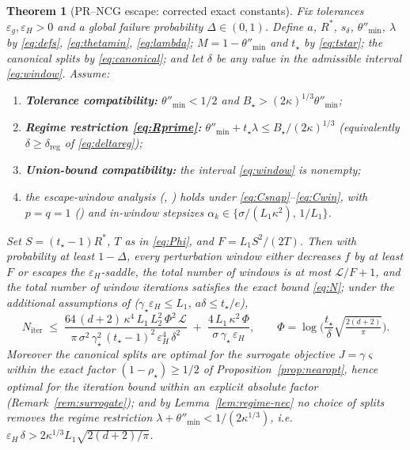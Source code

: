 \documentclass[11pt,a4paper]{article}
\theoremstyle{plain}
\newtheorem{theorem}{Theorem}
\theoremstyle{definition}
\newcommand{\eps}{\varepsilon}
\newcommand{\epsg}{\eps_{g}}
\newcommand{\epsH}{\eps_{H}}
\newcommand{\sdel}{s_{\delta}}
\newcommand{\LL}{\mathcal{L}}
\newcommand{\Rstar}{R^{*}}
\newcommand{\Niter}{N_{\mathrm{iter}}}
\newcommand{\tstar}{t_\star}
\newcommand{\thetamin}{\theta''_{\min}}
\begin{document}
\begin{theorem}[PR--NCG escape: corrected exact constants]\label{thm:main}
Fix tolerances $\epsg, \epsH > 0$ and a global failure probability
$\Delta \in (0,1)$. Define $a$, $\Rstar$, $\sdel$, $\thetamin$, $\lambda$ by
\eqref{eq:defs}, \eqref{eq:thetamin}, \eqref{eq:lambda};
$M = 1-\thetamin$ and $\tstar$ by \eqref{eq:tstar}; the canonical splits by
\eqref{eq:canonical}; and let $\delta$ be any value in the admissible
interval \eqref{eq:window}. Assume:
\begin{enumerate}
\item \textbf{Tolerance compatibility:} $\thetamin < 1/2$ and
$B_\star > (2\kappa)^{1/3}\thetamin$;
\item \textbf{Regime restriction \eqref{eq:Rprime}:}
$\thetamin + \tstar\lambda \le B_\star/(2\kappa)^{1/3}$
(equivalently $\delta \ge \delta_{\mathrm{reg}}$ of
\eqref{eq:deltareg});
\item \textbf{Union-bound compatibility:} the interval \eqref{eq:window}
is nonempty;
\item the escape-window analysis (,
) holds under
\eqref{eq:Csnap}--\eqref{eq:Cwin}, with $p=q=1$ () and
in-window stepsizes $\alpha_k \in \{\sigma/(L_1\kappa^2),\, 1/L_1\}$.
\end{enumerate}
Set $S = (\tstar-1)\Rstar$, $T$ as in \eqref{eq:Phi}, and
$F = L_1 S^2/(2T)$. Then with probability at least $1-\Delta$, every
perturbation window either decreases $f$ by at least $F$ or escapes the
$\epsH$-saddle, the total number of windows is at most $\LL/F + 1$, and the
total number of window iterations satisfies the exact bound \eqref{eq:N};
under the additional assumptions of 
($\gamma_\star\epsH \le L_1$, $a\delta \le \tstar/e$),
\[
\Niter \;\le\;
\frac{64\,(d+2)\,\kappa^4\,L_1\,L_2^2\,\Phi^2\,\LL}
{\pi\,\sigma^2\,\gamma_\star^2\,(\tstar-1)^2\,\epsH^4\,\delta^2}
\;+\; \frac{4\,L_1\,\kappa^2\,\Phi}{\sigma\,\gamma_\star\,\epsH},
\qquad
\Phi = \log\!\Big(\frac{\tstar}{\delta}\sqrt{\tfrac{2(d+2)}{\pi}}\Big).
\]
Moreover the canonical splits are optimal for the surrogate objective
$J = \gamma\varsigma$ within the exact factor $(1-\rho_\star) \ge 1/2$ of
Proposition~\ref{prop:nearopt}, hence optimal for the iteration bound
within an explicit absolute factor (Remark~\ref{rem:surrogate}); and by
Lemma~\ref{lem:regime-nec} no choice of splits removes the regime
restriction $\lambda + \thetamin < 1/(2\kappa^{1/3})$, i.e.\
$\epsH\,\delta > 2\kappa^{1/3}L_1\sqrt{2(d+2)/\pi}$.
\end{theorem}
\end{document}
